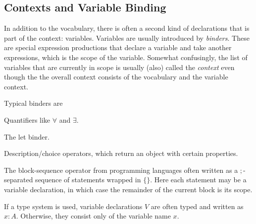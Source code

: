 \subsection{Contexts and Variable Binding}

In addition to the vocabulary, there is often a second kind of declarations that is part of the context: variables.
Variables are usually introduced by \emph{binders}.
These are special expression productions that declare a variable and take another expressions, which is the scope of the variable.
Somewhat confusingly, the list of variables that are currently in scope is usually (also) called the \emph{context} even though the the overall context consists of the vocabulary and the variable context.

Typical binders are
\begin{compactitem}
\item Quantifiers like $\forall$ and $\exists$.
\item The let binder.
\item Description/choice operators, which return an object with certain properties.
\item The block-sequence operator from programming languages often written as a $;$-separated sequence of statements wrapped in $\{\}$.
Here each statement may be a variable declaration, in which case the remainder of the current block is its scope.
\end{compactitem}

If a type system is used, variable declarations $V$ are often typed and written as $x:A$.
Otherwise, they consist only of the variable name $x$.

